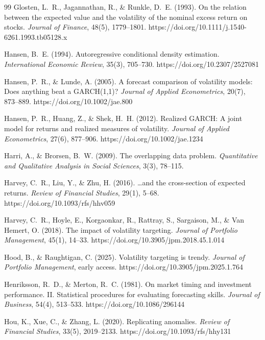 \documentclass[12pt,a4paper]{article}
\begin{document}
\begin{thebibliography}{99}
Glosten, L.~R., Jagannathan, R., \& Runkle, D.~E. (1993). On the relation between the expected value and the volatility of the nominal excess return on stocks. \textit{Journal of Finance}, 48(5), 1779--1801. https://doi.org/10.1111/j.1540-6261.1993.tb05128.x

Hansen, B.~E. (1994). Autoregressive conditional density estimation. \textit{International Economic Review}, 35(3), 705--730. https://doi.org/10.2307/2527081

Hansen, P.~R., \& Lunde, A. (2005). A forecast comparison of volatility models: Does anything beat a GARCH(1,1)? \textit{Journal of Applied Econometrics}, 20(7), 873--889. https://doi.org/10.1002/jae.800

Hansen, P.~R., Huang, Z., \& Shek, H.~H. (2012). Realized GARCH: A joint model for returns and realized measures of volatility. \textit{Journal of Applied Econometrics}, 27(6), 877--906. https://doi.org/10.1002/jae.1234

Harri, A., \& Brorsen, B.~W. (2009). The overlapping data problem. \textit{Quantitative and Qualitative Analysis in Social Sciences}, 3(3), 78--115.

Harvey, C.~R., Liu, Y., \& Zhu, H. (2016). \ldots and the cross-section of expected returns. \textit{Review of Financial Studies}, 29(1), 5--68. https://doi.org/10.1093/rfs/hhv059

Harvey, C.~R., Hoyle, E., Korgaonkar, R., Rattray, S., Sargaison, M., \& Van Hemert, O. (2018). The impact of volatility targeting. \textit{Journal of Portfolio Management}, 45(1), 14--33. https://doi.org/10.3905/jpm.2018.45.1.014

Hood, B., \& Raughtigan, C. (2025). Volatility targeting is trendy. \textit{Journal of Portfolio Management}, early access. https://doi.org/10.3905/jpm.2025.1.764

Henriksson, R.~D., \& Merton, R.~C. (1981). On market timing and investment performance. II. Statistical procedures for evaluating forecasting skills. \textit{Journal of Business}, 54(4), 513--533. https://doi.org/10.1086/296144

Hou, K., Xue, C., \& Zhang, L. (2020). Replicating anomalies. \textit{Review of Financial Studies}, 33(5), 2019--2133. https://doi.org/10.1093/rfs/hhy131


\end{thebibliography}
\end{document}
